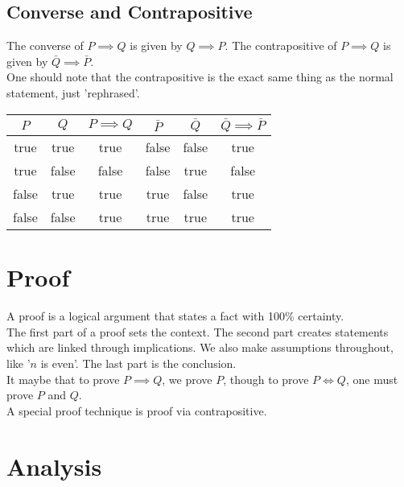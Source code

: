 \documentclass{article}
\begin{document}
        \subsection{Converse and Contrapositive}
            The converse of $P\implies Q$ is given by $Q \implies P$. The contrapositive of $P \implies Q$ is given by $\bar{Q} \implies \bar{P}$. \\

            One should note that the contrapositive is the exact same thing as the normal statement, just 'rephrased'. 

            \begin{center}
                \begin{tabular}{|c|c|c|c|c|c|}
                    \hline
                    $P$ & $Q$ & $P \implies Q$ & $\bar{P}$ & $\bar{Q}$ & $\bar{Q} \implies \bar{P}$ \\
                    \hline
                    true & true & true & false & false & true \\
                    true & false & false & false & true & false \\
                    false & true & true & true & false & true \\
                    false & false & true & true & true & true \\
                    \hline
                \end{tabular}
            \end{center}

    \section{Proof}
         A proof is a logical argument that states a fact with 100\% certainty.\\

         The first part of a proof sets the context. The second part creates statements which are linked through implications. We also make assumptions throughout, like '$n$ is even'. The last part is the conclusion.\\
         
         It maybe that to prove $P\implies Q$, we prove $P$, though to prove $P \iff Q$, one must prove $P$ and $Q$.\\

         A special proof technique is proof via contrapositive. 

    \section{Analysis}
\end{document}
